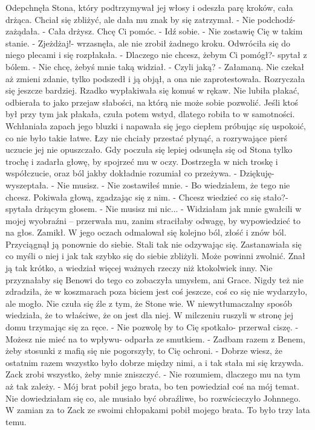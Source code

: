 \documentclass[12pt,a4paper]{book}
\begin{document}
Odepchnęła Stona, który podtrzymywał jej włosy i odeszła parę kroków, cała drżąca. Chciał się zbliżyć, ale dała mu znak by się zatrzymał. 
- Nie podchodź- zażądała.
- Cała drżysz. Chcę Ci pomóc. 
- Idź sobie.
- Nie zostawię Cię w takim stanie. 
- Zjeżdżaj!- wrzasnęła, ale nie zrobił żadnego kroku. 
Odwróciła się do niego plecami i się rozpłakała. 
- Dlaczego nie chcesz, żebym Ci pomógł?- spytał z bólem.
- Nie chcę, żebyś mnie taką widział. 
- Czyli jaką?
- Załamaną. 
Nie czekał aż zmieni zdanie, tylko podszedł i ją objął, a ona nie zaprotestowała. Rozryczała się jeszcze bardziej. Rzadko wypłakiwała się komuś w rękaw. Nie lubiła płakać, odbierała to jako przejaw słabości, na którą nie może sobie pozwolić. Jeśli ktoś był przy tym jak płakała, czuła potem wstyd, dlatego robiła to w samotności. 
Wchłaniała zapach jego bluzki i napawała się jego ciepłem próbując się uspokoić, co nie było takie łatwe. Łzy nie chciały przestać płynąć, a rozrywające pierś uczucie jej nie opuszczało. 
Gdy poczuła się lepiej odsunęła się od Stona tylko trochę i zadarła głowę, by spojrzeć mu w oczy. Dostrzegła w nich troskę i współczucie, oraz ból jakby dokładnie rozumiał co przeżywa. 
- Dziękuję- wyszeptała. 
- Nie musisz. 
- Nie zostawiłeś mnie. 
- Bo wiedziałem, że tego nie chcesz. 
Pokiwała głową, zgadzając się z nim. 
- Chcesz wiedzieć co się stało?- spytała drżącym głosem.
- Nie musisz mi nic...
- Widziałam jak mnie gwałcili w mojej wyobraźni – przerwała mu, zanim straciłaby odwagę, by wypowiedzieć to na głos. 
Zamikł. W jego oczach odmalował się kolejno ból, złość i znów ból. Przyciągnął ją ponownie do siebie. Stali tak nie odzywając się. Zastanawiała się co myśli o niej i jak tak szybko się do siebie zbliżyli. Może powinni zwolnić. Znał ją tak krótko, a wiedział więcej ważnych rzeczy niż ktokolwiek inny. Nie przyznałaby się Benowi do tego co zobaczyła umysłem, ani Grace. Nigdy też nie zdradziła, że w koszmarach poza biciem jest coś jeszcze, coś co się nie wydarzyło, ale mogło. Nie czuła się źle z tym, że Stone wie. W niewytłumaczalny sposób wiedziała, że to właściwe, że on jest dla niej. 
W milczeniu ruszyli w stronę jej domu trzymając się za ręce. 
- Nie pozwolę by to Cię spotkało- przerwał ciszę. 
- Możesz nie mieć na to wpływu- odparła ze smutkiem. 
- Zadbam razem z Benem, żeby stosunki z mafią się nie pogorszyły, to Cię ochroni.
- Dobrze wiesz, że ostatnim razem wszystko było dobrze między nimi, a i tak stała mi się krzywda. Zack zrobi wszystko, żeby mnie zniszczyć. 
- Nie rozumiem, dlaczego mu na tym aż tak zależy. 
- Mój brat pobił jego brata, bo ten powiedział coś na mój temat. Nie dowiedziałam się co, ale musiało być obraźliwe, bo rozwścieczyło Johnnego. W zamian za to Zack ze swoimi chłopakami pobił mojego brata. To było trzy lata temu. 
\end{document}
